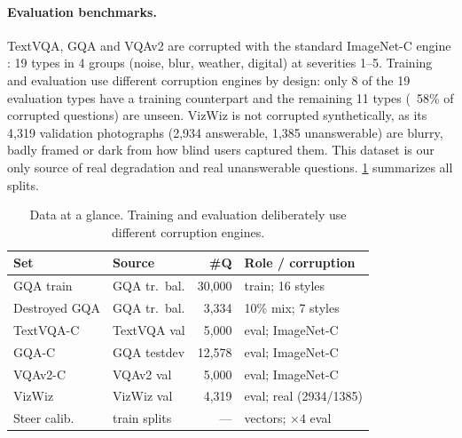 \documentclass[10pt,twocolumn,letterpaper]{article}
\begin{document}
\paragraph{Evaluation benchmarks.}
 TextVQA, GQA and VQAv2 are corrupted with the standard ImageNet-C engine \citep{hendrycks2019benchmarkingneuralnetworkrobustness}: 19 types in 4 groups (noise, blur, weather, digital) at severities 1–5. Training and evaluation use different corruption engines by design: only 8 of the 19 evaluation types have a training counterpart and the remaining 11 types (~58\% of corrupted questions) are unseen. VizWiz \citep{gurari2018vizwizgrandchallengeanswering} is not corrupted synthetically, as its 4,319 validation photographs (2,934 answerable, 1,385 unanswerable) are blurry, badly framed or dark from how blind users captured them. This dataset is our only source of real degradation and real unanswerable questions. \cref{tab:data} summarizes all splits.
\begin{table}[tb]
\centering
\caption{Data at a glance. Training and evaluation deliberately use different corruption
engines.}
\label{tab:data}
\footnotesize
\setlength{\tabcolsep}{3pt}
\begin{tabular}{@{}llrl@{}}
\toprule
Set & Source & \#Q & Role / corruption \\
\midrule
GQA train     & GQA tr.\ bal.  & 30{,}000 & train; 16 styles \\
Destroyed GQA & GQA tr.\ bal.  & 3{,}334  & 10\% mix; 7 styles \\
TextVQA-C     & TextVQA val    & 5{,}000  & eval; ImageNet-C \\
GQA-C         & GQA testdev    & 12{,}578 & eval; ImageNet-C \\
VQAv2-C       & VQAv2 val      & 5{,}000  & eval; ImageNet-C \\
VizWiz        & VizWiz val     & 4{,}319  & eval; real (2934/1385) \\
Steer calib.  & train splits   & ---      & vectors; $\times4$ eval \\
\bottomrule
\end{tabular}
\end{table}
\end{document}

